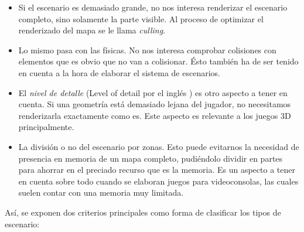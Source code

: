 \begin{itemize}
	\item Si el escenario es demasiado grande, no nos interesa renderizar el escenario completo, sino solamente la parte visible. Al proceso de optimizar el renderizado del mapa se le llama \emph{culling}\cite{culling}.
	\item Lo mismo pasa con las físicas. No nos interesa comprobar colisiones con elementos que es obvio que no van a colisionar. Ésto también ha de ser tenido en cuenta a la hora de elaborar el sistema de escenarios.
	\item El \emph{nivel de detalle} (Level of detail por el inglés \cite{lod}) es otro aspecto a tener en cuenta. Si una geometría está demasiado lejana del jugador, no necesitamos renderizarla exactamente como es. Este aspecto es relevante a los juegos 3D principalmente.
	\item La división o no del escenario por zonas. Esto puede evitarnos la necesidad de presencia en memoria de un mapa completo, pudiéndolo dividir en partes para ahorrar en el preciado recurso que es la memoria. Es un aspecto a tener en cuenta sobre todo cuando se elaboran juegos para videoconsolas, las cuales suelen contar con una memoria muy limitada.
\end{itemize}

Así, se exponen dos criterios principales como forma de clasificar los tipos de escenario:


